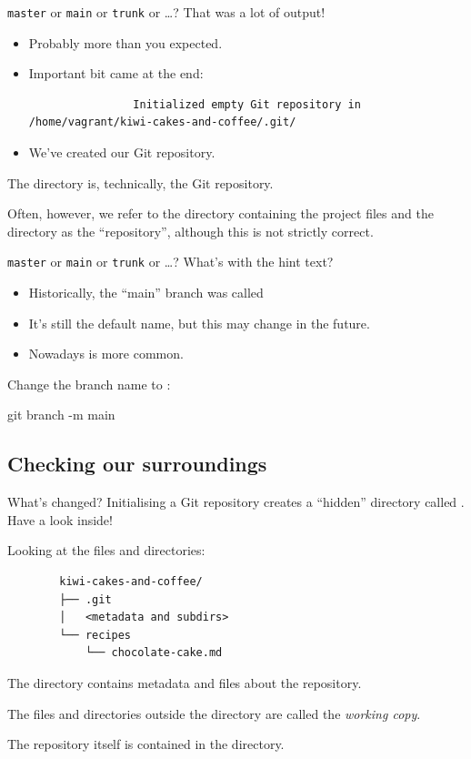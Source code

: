 \documentclass{git_course}
\begin{document}
\begin{frame}[fragile]{\texttt{master} or \texttt{main} or \texttt{trunk} or \ldots?}
    That was a lot of output!
    \begin{itemize}
        \item Probably more than you expected.
        \item Important bit came at the end:
            \begin{verbatim}
                Initialized empty Git repository in /home/vagrant/kiwi-cakes-and-coffee/.git/
            \end{verbatim}
        \item We've created our Git repository. 
    \end{itemize}
    The  directory is, technically, the Git repository.

    Often, however, we refer to the directory containing the project files
    and the  directory as the ``repository'', although this is
    not strictly correct.
\end{frame}

\begin{frame}[fragile]{\texttt{master} or \texttt{main} or \texttt{trunk} or \ldots?}
    What's with the hint text?
    \begin{itemize}
        \item Historically, the ``main'' branch was called 
        \item It's still the default name, but this may change in the
            future.
        \item Nowadays  is more common.
    \end{itemize}

    Change the branch name to :
    \begin{shellcode}
        git branch -m main
    \end{shellcode}
\end{frame}

\subsection{Checking our surroundings}

\begin{frame}[fragile]{What's changed?}
    Initialising a Git repository creates a ``hidden'' directory called
    .  Have a look inside!

    Looking at the files and directories:
    \begin{verbatim}
        kiwi-cakes-and-coffee/
        ├── .git
        │   <metadata and subdirs>
        └── recipes
            └── chocolate-cake.md
    \end{verbatim}

    The  directory contains metadata and files about the
    repository.

    The files and directories outside the  directory are called
    the \emph{working copy}.

    The repository itself is contained in the  directory.
\end{frame}
\end{document}
